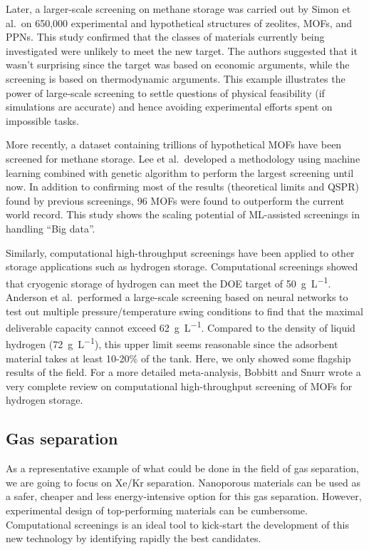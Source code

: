 \documentclass[main.tex]{subfiles}
\begin{document}
Later, a larger-scale screening on methane storage was carried out by Simon et al.\ on 650,000 experimental and hypothetical structures of zeolites, MOFs, and PPNs. This study confirmed that the classes of materials currently being investigated were unlikely to meet the new target. The authors suggested that it wasn't surprising since the target was based on economic arguments, while the screening is based on thermodynamic arguments.\autocite{Simon_2015_EES} This example illustrates the power of large-scale screening to settle questions of physical feasibility (if simulations are accurate) and hence avoiding experimental efforts spent on impossible tasks.

More recently, a dataset containing trillions of hypothetical MOFs have been screened for methane storage.\autocite{Lee_2021} Lee et al.\ developed a methodology using machine learning combined with genetic algorithm to perform the largest screening until now. In addition to confirming most of the results (theoretical limits and QSPR) found by previous screenings, 96 MOFs were found to outperform the current world record. This study shows the scaling potential of ML-assisted screenings in handling ``Big data''.

Similarly, computational high-throughput screenings have been applied to other storage applications such as hydrogen storage. Computational screenings showed that cryogenic storage of hydrogen can meet the DOE target of \SI{50}{\gram\per\liter}.\autocite{Gomez_Gualdron_2016, Bobbitt_2016, Thornton_2017} Anderson et al.\ performed a large-scale screening based on neural networks to test out multiple pressure/temperature swing conditions to find that the maximal deliverable capacity cannot exceed \SI{62}{\gram\per\liter}.\autocite{Anderson_2018} Compared to the density of liquid hydrogen (\SI{72}{\gram\per\liter}), this upper limit seems reasonable since the adsorbent material takes at least {10-20\%} of the tank. Here, we only showed some flagship results of the field. For a more detailed meta-analysis, Bobbitt and Snurr wrote a very complete review on computational high-throughput screening of MOFs for hydrogen storage.\autocite{Bobbitt_2019}

\subsection{Gas separation}

As a representative example of what could be done in the field of gas separation, we are going to focus on Xe/Kr separation. Nanoporous materials can be used as a safer, cheaper and less energy-intensive option for this gas separation. However, experimental design of top-performing materials can be cumbersome. Computational screenings is an ideal tool to kick-start the development of this new technology by identifying rapidly the best candidates.
\end{document}
